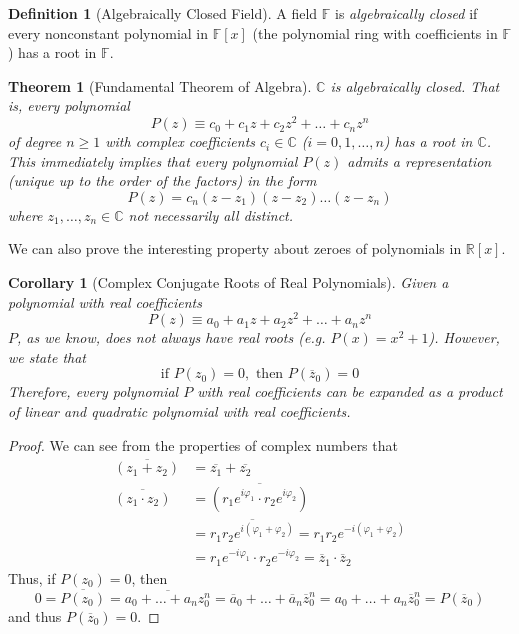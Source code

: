 \documentclass{article}
\newtheorem{theorem}{Theorem}[section]
\newtheorem{corollary}{Corollary}[theorem]
\theoremstyle{remark}
\theoremstyle{definition}
\newtheorem{definition}{Definition}[section]
\begin{document}
\begin{definition}[Algebraically Closed Field]
A field $\mathbb{F}$ is \textit{algebraically closed} if every nonconstant polynomial in $\mathbb{F}[x]$ (the polynomial ring with coefficients in $\mathbb{F}$) has a root in $\mathbb{F}$. 
\end{definition}

\begin{theorem}[Fundamental Theorem of Algebra]
$\mathbb{C}$ is algebraically closed. That is, every polynomial 
\[P(z) \equiv c_0 + c_1 z + c_2 z^2 + \ldots + c_n z^n\]
of degree $n\geq 1$ with complex coefficients $c_i \in \mathbb{C}$ ($i = 0, 1, \ldots, n$) has a root in $\mathbb{C}$. This immediately implies that every polynomial $P(z)$ admits a representation (unique up to the order of the factors) in the form 
\[P(z) = c_n (z - z_1) (z - z_2) \ldots (z - z_n)\]
where $z_1, \ldots, z_n \in \mathbb{C}$ not necessarily all distinct. 
\end{theorem}

We can also prove the interesting property about zeroes of polynomials in $\mathbb{R}[x]$. 

\begin{corollary}[Complex Conjugate Roots of Real Polynomials]
Given a polynomial with real coefficients
\[P(z) \equiv a_0 + a_1 z + a_2 z^2 + \ldots + a_n z^n\]
$P$, as we know, does not always have real roots (e.g. $P(x) = x^2 + 1$). However, we state that
\[\text{if } P(z_0) = 0, \text{ then } P(\overline{z}_0) = 0\]
Therefore, every polynomial $P$ with real coefficients can be expanded as a product of linear and quadratic polynomial with real coefficients. 
\end{corollary}
\begin{proof}
We can see from the properties of complex numbers that
\begin{align*}
    \overline{(z_1 + z_2)} & = \overline{z_1} + \overline{z_2} \\
    \overline{(z_1 \cdot z_2)} & = \overline{(r_1 e^{i \varphi_1} \cdot r_2 e^{i \varphi_2})} \\
    & = \overline{r_1 r_2 e^{i(\varphi_1 + \varphi_2)}} = r_1 r_2 e^{-i(\varphi_1 + \varphi_2)} \\
    & = r_1 e^{-i\varphi_1} \cdot r_2 e^{-i \varphi_2} = \overline{z}_1 \cdot \overline{z}_2
\end{align*}
Thus, if $P(z_0) = 0$, then 
\[0 = \overline{P(z_0)} = \overline{a_0 + \ldots + a_n z_0^n} = \overline{a}_0 + \ldots + \overline{a}_n \overline{z}_0^n  = a_0 + \ldots + a_n \overline{z}_0^n = P(\overline{z}_0)\]
and thus $P(\overline{z}_0) = 0$. 
\end{proof}
\end{document}

